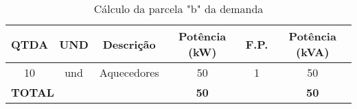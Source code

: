 \begin{table}[H]
\centering
\caption{Cálculo da parcela "b" da demanda}
\begin{tabular}{|c|c|c|c|c|c|}
\hline
\textbf{QTDA} & \textbf{UND} & \textbf{Descrição} & \textbf{Potência (kW)} & \textbf{F.P.} & \textbf{Potência (kVA)} \\ \hline
10            & und          & Aquecedores        & 50                     & 1             & 50                      \\ \hline
\multicolumn{3}{|l|}{\textbf{TOTAL}}              & \textbf{50}            & \textbf{}     & \textbf{50}             \\ \hline
\end{tabular}
\end{table}